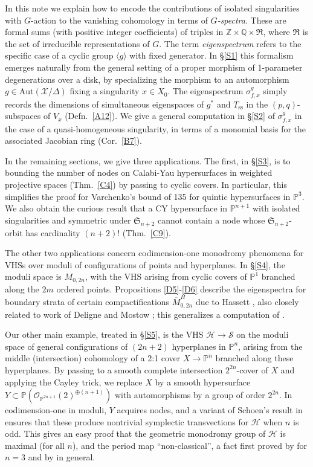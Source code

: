 \documentclass[12pt,letterpaper,english]{amsart}
\numberwithin{equation}{section}
\numberwithin{figure}{section}
\theoremstyle{plain}
\theoremstyle{remark}
\theoremstyle{definition}
\theoremstyle{definition}
\theoremstyle{plain}
\theoremstyle{plain}
\theoremstyle{plain}
\theoremstyle{plain}
\theoremstyle{definition}
\def\PP{\mathbb{P}}
\def\X{\mathcal{X}}
\def\H{\mathcal{H}}
\def\co{\mathcal{O}}
\theoremstyle{definition}
\begin{document}
In this note we explain how to encode the contributions of isolated singularities with $G$-action to the vanishing cohomology in terms of \emph{$G$-spectra}.  These are formal sums (with positive integer coefficients) of triples in $\mathbb{Z} \times \mathbb{Q} \times \mathfrak{R}$, where $\mathfrak{R}$ is the set of irreducible representations of $G$. The term \emph{eigenspectrum} refers to the specific case of a cyclic group $\langle g\rangle$ with fixed generator.  In \S\ref{S1} this formalism emerges naturally from the general setting of a proper morphism of 1-parameter degenerations over a disk, by specializing the morphism to an automorphism $g\in \mathrm{Aut}(\X/\Delta)$ fixing a singularity $x\in X_0$.  The eigenspectrum $\sigma_{f,x}^g$ simply records the dimensions of simultaneous eigenspaces of $g^*$ and $T_{\mathrm{ss}}$ in the $(p,q)$-subspaces of $V_x$ (Defn.~\ref{A12}).  We give a general computation in \S\ref{S2} of $\sigma_{f,x}^g$ in the case of a quasi-homogeneous singularity, in terms of a monomial basis for the associated Jacobian ring (Cor.~\ref{B7}). 

In the remaining sections, we give three applications.  The first, in \S\ref{S3}, is to bounding the number of nodes on Calabi-Yau hypersurfaces in weighted projective spaces (Thm.~\ref{C4}) by passing to cyclic covers.  In particular, this simplifies the proof for Varchenko's bound of 135 for quintic hypersurfaces in $\PP^3$.  We also obtain the curious result that a CY hypersurface in $\PP^{n+1}$ with isolated singularities and symmetric under $\mathfrak{S}_{n+2}$ cannot contain a node whose $\mathfrak{S}_{n+2}$-orbit has cardinality $(n+2)!$ (Thm.~\ref{C9}).

The other two applications concern codimension-one monodromy phenomena for VHSs over moduli of configurations of points and hyperplanes.  In \S\ref{S4}, the moduli space is $M_{0,2n}$, with the VHS arising from cyclic covers of $\PP^1$ branched along the $2m$ ordered points.  Propositions \ref{D5}-\ref{D6} describe the eigenspectra for boundary strata of certain compactifications $\overline{M}^H_{0,2n}$ due to Hassett \cite{Ha}, also closely related to work of Deligne and Mostow \cite{DM}; this generalizes a computation of \cite{GKS}.  

Our other main example, treated in \S\ref{S5}, is the VHS $\mathcal{H}\to\mathcal{S}$ on the moduli space of general configurations of $(2n+2)$ hyperplanes in $\PP^n$, arising from the middle (intersection) cohomology of a 2:1 cover $X\to \PP^n$ branched along these hyperplanes.  By passing to a smooth complete intersection $2^{2n}$-cover of $X$ and applying the Cayley trick, we replace $X$ by a smooth hypersurface $Y\subset \PP(\co_{\PP^{2n+1}}(2)^{\oplus (n+1)})$ with automorphisms by a group of order $2^{2n}$.  In codimension-one in moduli, $Y$ acquires nodes, and a variant of Schoen's result in \cite{Sc} ensures that these produce nontrivial symplectic transvections for $\H$ when $n$ is odd.  This gives an easy proof that the geometric monodromy group of $\H$ is maximal (for all $n$), and the period map ``non-classical'', a fact first proved by \cite{GSVZ} for $n=3$ and by \cite{SXZ} in general.
\end{document}
